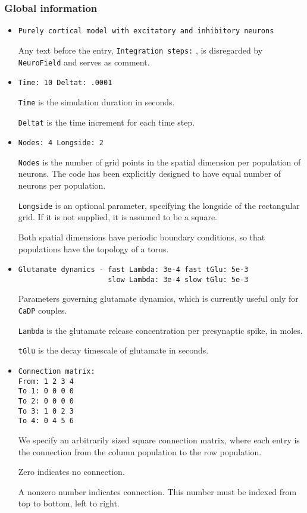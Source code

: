 \documentclass[12pt,a4paper]{article}
\newcommand{\type}[1]{ {\small\small\tt #1} }
\begin{document}
\subsubsection{Global information}
\label{sec:global}
\begin{itemize}

\item
\begin{lstlisting}
Purely cortical model with excitatory and inhibitory neurons
\end{lstlisting}
Any text before the entry, \type{Integration steps:}, is disregarded by \type{NeuroField} and serves as comment.
\item
\begin{lstlisting}
Time: 10 Deltat: .0001 
\end{lstlisting}
\type{Time} is the simulation duration in seconds.

\type{Deltat} is the time increment for each time step.
\item
\begin{lstlisting}
Nodes: 4 Longside: 2
\end{lstlisting}
\type{Nodes} is the number of grid points in the spatial dimension per population of neurons. The code has been explicitly designed to have equal number of neurons per population.

\type{Longside} is an optional parameter, specifying the longside of the rectangular grid. If it is not supplied, it is assumed to be a square.

Both spatial dimensions have periodic boundary conditions, so that populations have the topology of a torus.
\item
\begin{lstlisting}
Glutamate dynamics - fast Lambda: 3e-4 fast tGlu: 5e-3
                     slow Lambda: 3e-4 slow tGlu: 5e-3
\end{lstlisting}
Parameters governing glutamate dynamics, which is currently useful only for \type{CaDP} couples.

\type{Lambda} is the glutamate release concentration per presynaptic spike, in moles.

\type{tGlu} is the decay timescale of glutamate in seconds.
\item
\begin{lstlisting}
Connection matrix:
From: 1 2 3 4
To 1: 0 0 0 0
To 2: 0 0 0 0
To 3: 1 0 2 3
To 4: 0 4 5 6
\end{lstlisting}
We specify an arbitrarily sized square connection matrix, where each entry is the connection from the column population to the row population.

Zero indicates no connection.

A nonzero number indicates connection. This number must be indexed from top to bottom, left to right.
\end{itemize}
\end{document}
